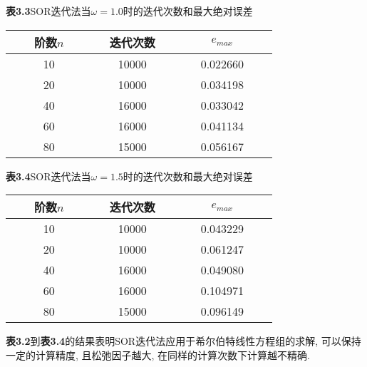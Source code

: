 \documentclass[a4paper,12pt]{article}
\begin{document}
\begin{CJK*}{UTF8}{gbsn}
\begin{center}
\end{center}\vspace{8pt}
\begin{center}
\textbf{表3.3}\quad SOR迭代法当$\omega=1.0$时的迭代次数和最大绝对误差\\\vspace{2pt}
\begin{tabular}{ccccccccccccc}
\toprule[1.5pt]
&& 阶数$n$ &&&& 迭代次数 &&&& $e_{max}$ &&\\
\midrule[1.5pt]
&& 10 &&&& 10000 &&&& 0.022660 &&\\
&& 20 &&&& 10000 &&&& 0.034198 &&\\
&& 40 &&&& 16000 &&&& 0.033042 &&\\
&& 60 &&&& 16000 &&&& 0.041134 &&\\
&& 80 &&&& 15000 &&&& 0.056167 &&\\
\bottomrule[1.5pt]
\end{tabular}
\end{center}\vspace{8pt}
\begin{center}
\textbf{表3.4}\quad SOR迭代法当$\omega=1.5$时的迭代次数和最大绝对误差\\\vspace{2pt}
\begin{tabular}{ccccccccccccc}
\toprule[1.5pt]
&& 阶数$n$ &&&& 迭代次数 &&&& $e_{max}$ &&\\
\midrule[1.5pt]
&& 10 &&&& 10000 &&&& 0.043229 &&\\
&& 20 &&&& 10000 &&&& 0.061247 &&\\
&& 40 &&&& 16000 &&&& 0.049080 &&\\
&& 60 &&&& 16000 &&&& 0.104971 &&\\
&& 80 &&&& 15000 &&&& 0.096149 &&\\
\bottomrule[1.5pt]
\end{tabular}
\end{center}\par
\textbf{表3.2}到\textbf{表3.4}的结果表明SOR迭代法应用于希尔伯特线性方程组的求解, 可以保持一定的计算精度, 且松弛因子越大, 在同样的计算次数下计算越不精确.


\end{CJK*}
\end{document}
